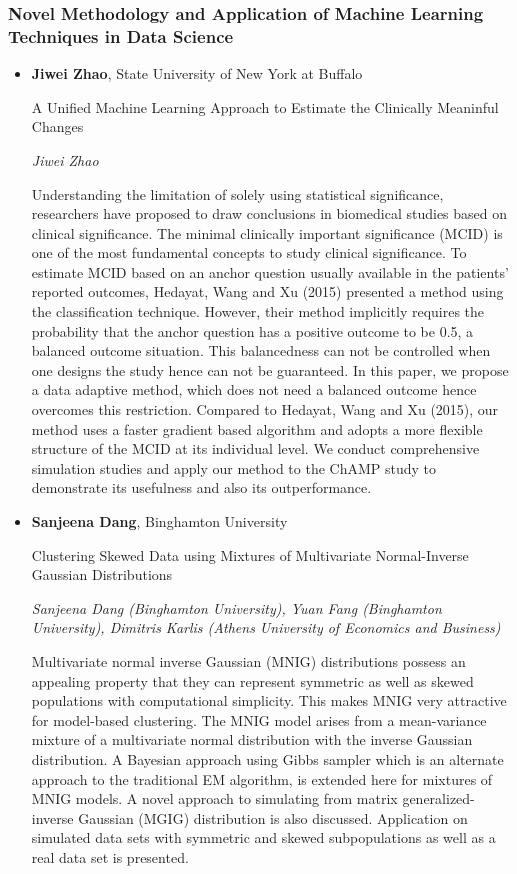 \subsubsection*{Novel Methodology and Application of Machine Learning Techniques in Data Science}

\begin{itemize}
\item \textbf{Jiwei Zhao}, State University of New York at Buffalo

A Unified Machine Learning Approach to Estimate the Clinically Meaninful Changes

\emph{\footnotesize Jiwei Zhao}

Understanding the limitation of solely using statistical significance, researchers have proposed to draw conclusions in biomedical studies based on clinical significance. The minimal clinically important significance (MCID) is one of the most fundamental concepts to study clinical significance. To estimate MCID based on an anchor question usually available in the patients' reported outcomes, Hedayat, Wang and Xu (2015) presented a method using the classification technique. However, their method implicitly requires the probability that the anchor question has a positive outcome to be 0.5, a balanced outcome situation. This balancedness can not be controlled when one designs the study hence can not be guaranteed. In this paper, we propose a data adaptive method,  which does not need a balanced outcome hence overcomes this restriction. Compared to Hedayat, Wang and Xu (2015), our method uses a faster gradient based algorithm and adopts a more flexible structure of the MCID at its individual level. We conduct comprehensive simulation studies and apply our method to the ChAMP study to demonstrate its usefulness and also its outperformance.

\item \textbf{Sanjeena Dang}, Binghamton University

Clustering Skewed Data using Mixtures of Multivariate Normal-Inverse Gaussian Distributions

\emph{\footnotesize Sanjeena Dang (Binghamton University), Yuan Fang (Binghamton University), Dimitris Karlis (Athens University of Economics and Business)}

Multivariate normal inverse Gaussian (MNIG) distributions possess an appealing property that they can represent symmetric as well as skewed populations with computational simplicity. This makes MNIG very attractive for model-based clustering. The MNIG model arises from a mean-variance mixture of a multivariate normal distribution with the inverse Gaussian distribution. A Bayesian approach using Gibbs sampler which is an alternate approach to the traditional EM algorithm, is extended here for mixtures of MNIG models. A novel approach to simulating from matrix generalized-inverse Gaussian (MGIG) distribution is also discussed. Application on simulated data sets with symmetric and skewed subpopulations as well as a real data set is presented.


\end{itemize}
